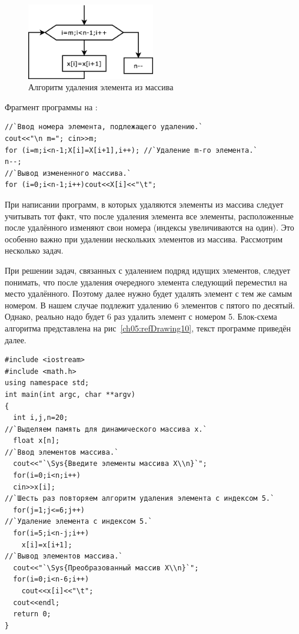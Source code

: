 \begin{figure}[htb]
\begin{center}
\includegraphics[width=0.5\textwidth]{img/ris_5_10}
\caption{Алгоритм удаления элемента из массива}
\label{ch05:refDrawing9}
\end{center}
\end{figure}

Фрагмент программы на :
\begin{lstlisting}
//`Ввод номера элемента, подлежащего удалению.`
cout<<"\n m="; cin>>m; 
for (i=m;i<n-1;X[i]=X[i+1],i++); //`Удаление m-го элемента.`
n--;
//`Вывод измененного массива.`
for (i=0;i<n-1;i++)cout<<X[i]<<"\t"; 
\end{lstlisting}

При написании программ, в которых удаляются элементы из массива следует учитывать тот факт, что после удаления элемента
все элементы, расположенные после удалённого изменяют свои номера (индексы увеличиваются на один). Это особенно важно
при удалении нескольких элементов из массива. Рассмотрим несколько задач.


При решении задач, связанных с удалением подряд идущих элементов, следует понимать, что после удаления очередного
элемента следующий переместил на место удалённого. Поэтому далее нужно будет удалять элемент с тем же самым номером. В
нашем случае подлежит удалению 6 элементов с пятого по десятый. Однако, реально надо будет 6 раз удалить элемент с
номером 5. Блок-схема алгоритма представлена на рис~\ref{ch05:refDrawing10}, текст программе приведён далее.
\begin{lstlisting}
#include <iostream>
#include <math.h>
using namespace std;
int main(int argc, char **argv)
{
  int i,j,n=20;
//`Выделяем память для динамического массива x.`
  float x[n];
//`Ввод элементов массива.`
  cout<<"`\Sys{Введите элементы массива X\\n}`";
  for(i=0;i<n;i++)
  cin>>x[i];
//`Шесть раз повторяем алгоритм удаления элемента с индексом 5.`
  for(j=1;j<=6;j++)
//`Удаление элемента с индексом 5.`
  for(i=5;i<n-j;i++)
    x[i]=x[i+1];
//`Вывод элементов массива.`
  cout<<"`\Sys{Преобразованный массив X\\n}`";
  for(i=0;i<n-6;i++)
    cout<<x[i]<<"\t";
  cout<<endl;
  return 0;
}
\end{lstlisting}

